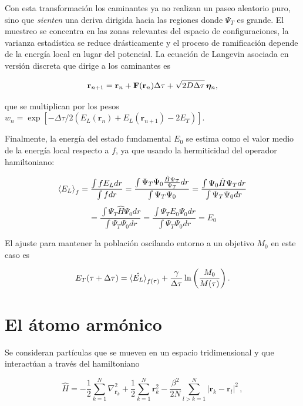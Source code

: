 \documentclass[11pt,a4paper,twoside,pdf]{article}
\numberwithin{equation}{section}
\begin{document}
Con esta transformación los caminantes ya no realizan un paseo aleatorio puro, sino que \textit{sienten} una deriva dirigida hacia las regiones donde $\Psi_T$ es grande. El muestreo se concentra en las zonas relevantes del espacio de configuraciones, la varianza estadística se reduce drásticamente y el proceso de ramificación depende de la energía local en lugar del potencial. La ecuación de Langevin asociada en versión discreta que dirige a los caminantes es

\begin{equation}
\mathbf r_{n+1}
=
\mathbf r_n
+
\mathbf F(\mathbf r_n)\Delta\tau
+
\sqrt{2D\Delta\tau}\,\boldsymbol\eta_n,
\notag
\end{equation}

que se multiplican por los pesos $w_n = \exp\left[-\Delta\tau / 2 \left(E_L(\mathbf r_{n}) + E_L(\mathbf r_{n+1}) - 2E_T\right)\right]$.


Finalmente, la energía del estado fundamental $E_0$ se estima como el valor medio de la energía local respecto a $f$, ya que usando la hermiticidad del operador hamiltoniano: 

$$
    \braket{E_L}_{f} = \frac{\int f E_L dr}{\int  f dr} = \frac{ \int \Psi_T \Psi_0 \frac{\hat{H} \Psi_T }{\Psi_T} dr}{ \int \Psi_T \Psi_0 } 
    = \frac{ \int \Psi_0 \hat{H} \Psi_T dr}{  \int \Psi_T \Psi_0 dr }
$$
$$
    = \frac{ \int \Psi_T \hat{H} \Psi_0 dr}{  \int \Psi_T \Psi_0 dr } = \frac{ \int \Psi_T E_0 \Psi_0 dr}{  \int \Psi_T \Psi_0 dr } = E_0
$$



El ajuste para mantener la población oscilando entorno a un objetivo $M_0$ en este caso es

$$E_T(\tau + \Delta \tau) = \braket{\hat{E_L}}_{f(\tau)} + \frac{\gamma}{\Delta \tau} \ln \left( \frac{M_0}{M(\tau)} \right).$$





\section{El átomo armónico}



Se consideran partículas que se mueven en un espacio tridimensional y que interactúan a través del hamiltoniano


\begin{equation}
    \hat{H} = -\frac{1}{2} \sum_{k=1}^N \nabla_{\mathbf{r}_k}^2 
    + \frac{1}{2} \sum_{k=1}^N \mathbf{r}_k^2  -\frac{\beta^2}{2N} \sum_{l>k=1}^N |\mathbf{r}_{k} - \mathbf{r}_l|^2 \,,
\label{hamiltonianoatomoarmonico}
\end{equation}
\end{document}
